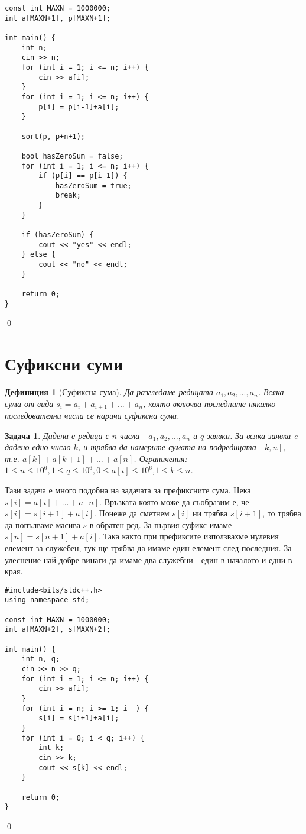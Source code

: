 \documentclass[]{article}
\newtheorem{problem}{Задача}
\newtheorem{definition}{Дефиниция}
\newenvironment{solution}{\noindent{\bf Решение.}\hspace*{1em}}{\qed\par}
\begin{document}
\begin{solution}
\begin{verbatim}
const int MAXN = 1000000;
int a[MAXN+1], p[MAXN+1];

int main() {
    int n;
    cin >> n;
    for (int i = 1; i <= n; i++) {
        cin >> a[i];
    }
    for (int i = 1; i <= n; i++) {
        p[i] = p[i-1]+a[i];
    }
    
    sort(p, p+n+1);
    
    bool hasZeroSum = false;
    for (int i = 1; i <= n; i++) {
        if (p[i] == p[i-1]) {
            hasZeroSum = true;
            break;
        }
    }
    
    if (hasZeroSum) {
        cout << "yes" << endl;
    } else {
        cout << "no" << endl;
    }

    return 0;
}
\end{verbatim}
\end{solution}

\section{Суфиксни суми}
\begin{definition}[Суфиксна сума]
Да разгледаме редицата $a_1,a_2,...,a_n$. Всяка сума от вида $s_i=a_i+a_{i+1}+...+a_n$, която включва последните няколко последователни числа се нарича суфиксна сума.
\end{definition}

\begin{problem}
Дадена е редица с $n$ числа - $a_1,a_2,...,a_n$ и $q$ заявки. За всяка заявка e дадено едно число $k$, и трябва да намерите сумата на подредицата $[k,n]$, т.е. $a[k]+a[k+1]+...+a[n]$.\newline
Ограничения: $1\leq n\leq 10^6,1\leq q\leq 10^6,0 \leq a[i]\leq 10^6$,$1\leq k\leq n$.
\end{problem}
\begin{solution}
Тази задача е много подобна на задачата за префиксните сума. Нека $s[i]=a[i]+...+a[n]$. Връзката която може да съобразим е, че $s[i]=s[i+1]+a[i]$.\newline
Понеже да сметнем $s[i]$ ни трябва $s[i+1]$, то трябва да попълваме масива $s$ в обратен ред.\newline
За първия суфикс имаме $s[n]=s[n+1]+a[i]$. Така както при префиксите използвахме нулевия елемент за служебен, тук ще трябва да имаме един елемент след последния. За улеснение най-добре винаги да имаме два служебни - един в началото и едни в края.
\begin{verbatim}
#include<bits/stdc++.h>
using namespace std;

const int MAXN = 1000000;
int a[MAXN+2], s[MAXN+2];

int main() {
    int n, q;
    cin >> n >> q;
    for (int i = 1; i <= n; i++) {
        cin >> a[i];
    }
    for (int i = n; i >= 1; i--) {
        s[i] = s[i+1]+a[i];
    }
    for (int i = 0; i < q; i++) {
        int k;
        cin >> k;
        cout << s[k] << endl;
    }

    return 0;
}
\end{verbatim}
\end{solution}
\end{document}
